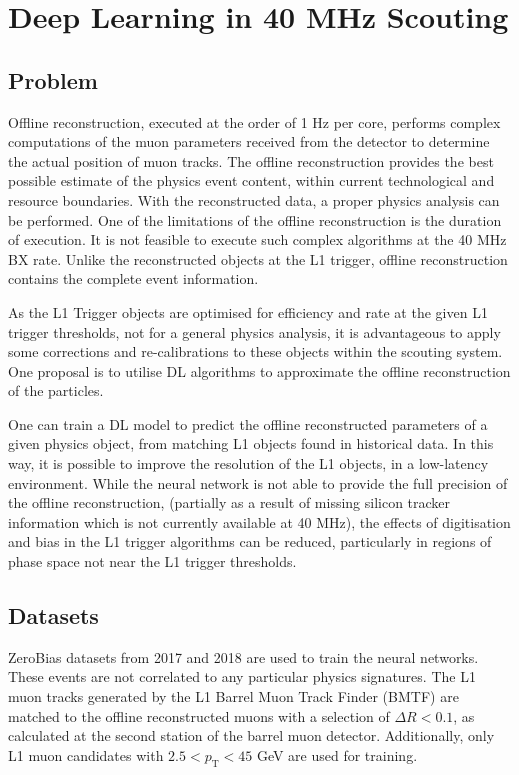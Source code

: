 \documentclass[10pt, paper=a4, UKenglish]{article}
\begin{document}
\section{Deep Learning in 40 MHz Scouting}
\label{Deep Learning in 40 MHz Scouting}

\subsection{Problem}
Offline reconstruction, executed at the order of 1 Hz per core, performs complex computations of the muon parameters received from the detector to determine the actual position of muon tracks. The offline reconstruction provides the best possible estimate of the physics event content, within current technological and resource boundaries. With the reconstructed data, a proper physics analysis can be performed. One of the limitations of the offline reconstruction is the duration of execution. It is not feasible to execute such complex algorithms at the 40 MHz BX rate. Unlike the reconstructed objects at the L1 trigger, offline reconstruction contains the complete event information.


As the L1 Trigger objects are optimised for efficiency and rate at the given L1 trigger thresholds, not for a general physics analysis, it is advantageous to apply some corrections and re-calibrations to these objects within the scouting system. One proposal is to utilise DL algorithms to approximate the offline reconstruction of the particles. 

One can train a DL model to predict the offline reconstructed parameters of a given physics object, from matching L1 objects found in historical data. In this way, it is possible to improve the resolution of the L1 objects, in a low-latency environment. While the neural network is not able to provide the full precision of the offline reconstruction, (partially as a result of missing silicon tracker information which is not currently available at 40 MHz), the effects of digitisation and bias in the L1 trigger algorithms can be reduced, particularly in regions of phase space not near the L1 trigger thresholds. 



\subsection{Datasets}

ZeroBias datasets from 2017 and 2018 are used to train the neural networks. These events are not correlated to any particular physics signatures. The L1 muon tracks generated by the L1 Barrel Muon Track Finder (BMTF) are matched to the offline reconstructed muons with a selection of $\Delta R < 0.1 $, as calculated at the second station of the barrel muon detector. Additionally, only L1 muon candidates with $2.5 < p_\mathrm{T} < 45$ GeV are used for training.
\end{document}
